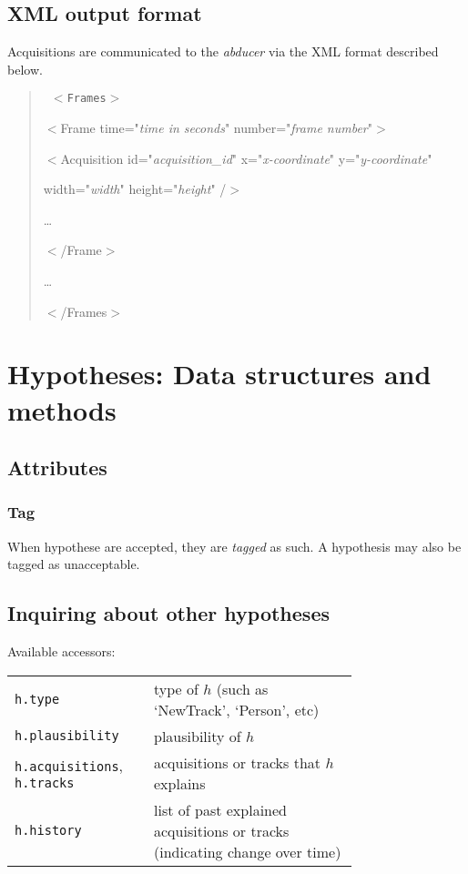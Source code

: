 \documentclass{book}
\begin{document}
\subsection{XML output format}

Acquisitions are communicated to the \emph{abducer} via the XML format described
below.

\begin{quote}
{\tt
$<$Frames$>$

$<$Frame time="{\it time in seconds}" number="{\it frame number}"$>$

$<$Acquisition id="{\it acquisition\_id}"
    x="{\it x-coordinate}" y="{\it y-coordinate}"

    \qquad width="{\it width}" height="{\it height}" /$>$

\dots

$<$/Frame$>$

\dots

$<$/Frames$>$
}
\end{quote}

\section{Hypotheses: Data structures and methods}
\label{sec:hypotheses-data-structures-and-methods}

\subsection{Attributes}

\subsubsection{Tag}
\label{sec:tag}

When hypothese are accepted, they are \emph{tagged} as such. A hypothesis may
also be tagged as unacceptable.

\subsection{Inquiring about other hypotheses}

Available accessors:
\begin{center}
\begin{tabular}{p{0.25\linewidth}p{0.5\linewidth}}
{\tt h.type}
    & type of $h$ (such as `NewTrack', `Person', etc)\\
{\tt h.plausibility}
    & plausibility of $h$\\
{\tt h.acquisitions}, {\tt h.tracks}
    & acquisitions or tracks that $h$ explains\\
{\tt h.history}
    & list of past explained acquisitions or tracks (indicating change over
time)\\
\end{tabular}
\end{center}
\end{document}
